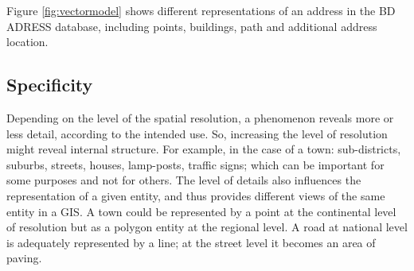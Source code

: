 Figure \ref{fig:vectormodel} shows different representations of an address in the BD ADRESS\circledR \hspace{1pt} database, including points, buildings, path and additional address location.

\begin{figure}[ht!]
\end{figure}


\subsection{Specificity}
 Depending on the level of the spatial resolution, a phenomenon reveals more or less detail, according to the intended use. So, increasing the level of resolution might reveal internal structure. For example, in the case of a town: sub-districts, suburbs, streets, houses, lamp-posts, traffic signs; which can be important for some purposes and not for others. The level of details also influences the representation of a given entity, and thus provides different views of the same entity in a GIS. A town could be represented by a point at the continental level of resolution but as a polygon entity at the regional level. A road at national level is adequately represented by a line; at the street level it becomes an area of paving.
 
